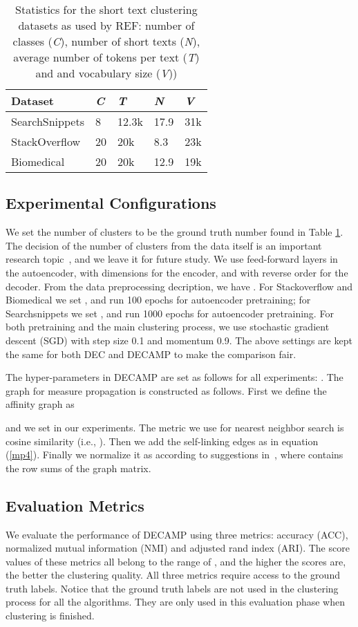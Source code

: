 \documentclass[letterpaper]{article}
\begin{document}
\begin{table}\label{stats}
    \begin{tabular}{lllll}
        \hline
        \textbf{Dataset}        & \textit{C}  & \textit{T}     & \textit{N}    & \textit{V } \\ \hline
        SearchSnippets & 8  & 12.3k & 17.9 & 31k \\
        StackOverflow  & 20 & 20k   & 8.3  & 23k \\
        Biomedical     & 20 & 20k   & 12.9 & 19k \\ \hline
    \end{tabular}
    \caption{Statistics for the short text clustering datasets as used by REF: number of classes (\textit{C}), number of short texts (\textit{N}), average number of tokens per text (\textit{T}) and and vocabulary size (\textit{V}))}

\end{table}

\subsection{Experimental Configurations}
We set the number of clusters  to be the ground truth number found in Table \ref{stats}. The decision of the number of clusters from the data itself is an important research topic~\cite{number}, and we leave it for future study. We use feed-forward layers in the autoencoder, with dimensions  for the encoder, and with reverse order for the decoder.  From the data preprocessing decription, we have . For Stackoverflow and Biomedical we set , and run 100 epochs for autoencoder pretraining; for Searchsnippets we set , and run 1000 epochs for autoencoder pretraining. For both pretraining and the main clustering process, we use stochastic gradient descent (SGD) with step size 0.1 and momentum 0.9. The above settings are kept the same for both DEC and DECAMP to make the comparison fair.

The hyper-parameters in DECAMP are set as follows for all experiments: . The graph  for measure propagation is constructed as follows. First we define the affinity graph  as

and we set  in our experiments. The metric we use for nearest neighbor search is cosine similarity (i.e., ). Then we add the self-linking edges  as in equation (\ref{mp4}). Finally we normalize it as  according to suggestions in~\cite{gcn}, where  contains the row sums of the graph matrix.

\subsection{Evaluation Metrics}
We evaluate the performance of DECAMP using three metrics: accuracy (ACC), normalized mutual information (NMI) and adjusted rand index (ARI). The score values of these metrics all belong to the range of , and the higher the scores are, the better the clustering quality. All three metrics require access to the ground truth labels. Notice that the ground truth labels are not used in the clustering process for all the algorithms. They are only used in this evaluation phase when clustering is finished. 
\end{document}
